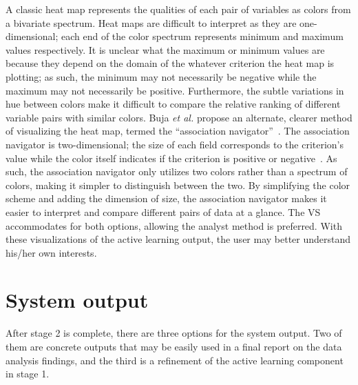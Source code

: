 \noindent A classic heat map represents the qualities of each pair of variables 
as colors from a bivariate spectrum. 
Heat maps are difficult to interpret as they are 
one-dimensional; each end of the color spectrum represents minimum and maximum 
values respectively. It is unclear what the maximum or minimum values are 
because they depend on the domain of the whatever criterion the heat map is 
plotting; as such, the minimum may not necessarily be negative while the 
maximum may not necessarily be positive. Furthermore, the subtle variations in 
hue between colors make it difficult to compare the relative ranking of 
different variable pairs with similar colors. Buja \textit{et al.} 
propose an alternate, clearer method of visualizing the heat map, termed the 
``association navigator''~\cite{buja2016}. The association navigator is 
two-dimensional; the size of each field corresponds to the criterion's value 
while the color itself indicates if the criterion is positive or 
negative~\cite{buja2016}. As such, the 
association navigator only utilizes two colors rather than a spectrum of 
colors, making it simpler to distinguish between the two. By simplifying the 
color scheme and adding the dimension of size, the association navigator makes 
it easier to interpret and compare different pairs of data at a glance. 
The VS accommodates for both options, 
allowing the analyst method is preferred. 
With these visualizations of the active learning output, the user may better 
understand his/her own interests. 

\section{System output}
\label{sec:visualizer:plotgeneration:output}

After stage 2 is complete, there are three options for the system output. 
Two of them are concrete outputs 
that may be easily used in a final report on the data analysis findings, and 
the third is a refinement of the active learning component in stage 1.


